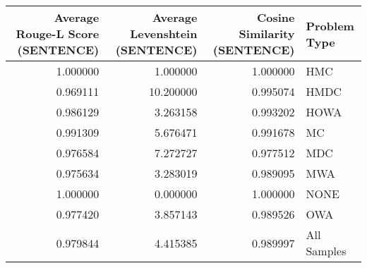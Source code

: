 \begin{tabular}{rrrl}
\toprule
Average Rouge-L Score (SENTENCE) & Average Levenshtein (SENTENCE) & Cosine Similarity (SENTENCE) & Problem Type \\
\midrule
1.000000 & 1.000000 & 1.000000 & HMC \\
0.969111 & 10.200000 & 0.995074 & HMDC \\
0.986129 & 3.263158 & 0.993202 & HOWA \\
0.991309 & 5.676471 & 0.991678 & MC \\
0.976584 & 7.272727 & 0.977512 & MDC \\
0.975634 & 3.283019 & 0.989095 & MWA \\
1.000000 & 0.000000 & 1.000000 & NONE \\
0.977420 & 3.857143 & 0.989526 & OWA \\
0.979844 & 4.415385 & 0.989997 & All Samples \\
\bottomrule
\end{tabular}
